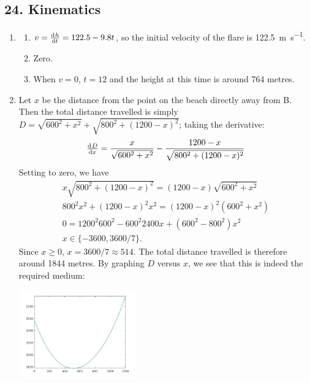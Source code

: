 \subsection*{24. Kinematics}
\begin{enumerate}
  \item
    \begin{enumerate}
      \item $ v = \od{h}{t} = 122.5 - 9.8t $, so the initial velocity of the flare is \SI{122.5}{\metre\per\second}.
      \item Zero.
      \item When $ v = 0 $, $ t = 12 $ and the height at this time is around 764 metres.
    \end{enumerate}
  \item Let $ x $ be the distance from the point on the beach directly away from B. Then the total distance travelled
        is simply $ D = \sqrt{600^2 + x^2} + \sqrt{800^2 + (1200-x)^2} $; taking the derivative:
        \begin{displaymath}
          \od{D}{x} = \frac{x}{\sqrt{600^2 + x^2}} - \frac{1200 - x}{\sqrt{800^2 + (1200 - x)^2}}
        \end{displaymath}
        Setting to zero, we have
        \begin{gather*}
          x\sqrt{800^2 + (1200 - x)^2} = (1200 - x)\sqrt{600^2 + x^2}\\
          800^2 x^2 + (1200 - x)^2 x^2 = (1200 - x)^2 (600^2 + x^2)\\
          0 =  1200^2 600^2 - 600^2 2400x + (600^2 - 800^2) x^2\\
          x \in \{ -3600, 3600/7 \}.
        \end{gather*}
        Since $ x \geq 0 $, $ x = 3600/7 \approx 514 $. The total distance travelled is therefore around 1844 metres. By graphing $ D $ versus $ x $,
        we see that this is indeed the required medium:
        \begin{center}
          \includegraphics[width=0.4\textwidth]{swamp}
        \end{center}
\end{enumerate}

